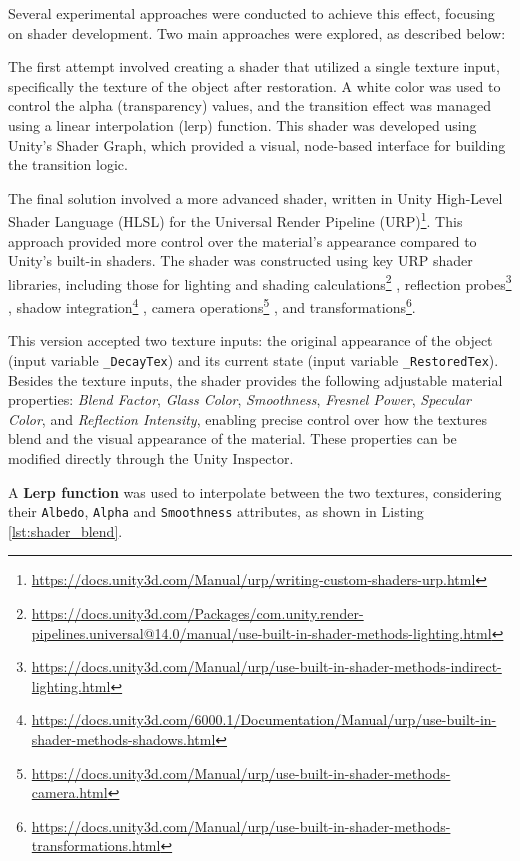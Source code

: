 Several experimental approaches were conducted to achieve this effect, focusing on shader development.
Two main approaches were explored, as described below:

The first attempt involved creating a shader that utilized a single texture input, specifically the texture of the object after restoration. A white color was used to control the alpha (transparency) values, and the transition effect was managed using a linear interpolation (lerp) function. This shader was developed using Unity’s Shader Graph, which provided a visual, node-based interface for building the transition logic.


The final solution involved a more advanced shader, written in Unity High-Level Shader Language (HLSL) for the Universal Render Pipeline (URP)\footnote{\url{https://docs.unity3d.com/Manual/urp/writing-custom-shaders-urp.html}}. 
This approach provided more control over the material's appearance compared to Unity's built-in shaders.
The shader was constructed using key URP shader libraries, including those for lighting and shading calculations\footnote{\url{https://docs.unity3d.com/Packages/com.unity.render-pipelines.universal@14.0/manual/use-built-in-shader-methods-lighting.html}}
, reflection probes\footnote{\url{https://docs.unity3d.com/Manual/urp/use-built-in-shader-methods-indirect-lighting.html}}
, shadow integration\footnote{\url{https://docs.unity3d.com/6000.1/Documentation/Manual/urp/use-built-in-shader-methods-shadows.html}}
, camera operations\footnote{\url{https://docs.unity3d.com/Manual/urp/use-built-in-shader-methods-camera.html}}
, and transformations\footnote{\url{https://docs.unity3d.com/Manual/urp/use-built-in-shader-methods-transformations.html}}.

This version accepted two texture inputs: the original appearance of the object (input variable \texttt{\_DecayTex}) and its current state (input variable \texttt{\_RestoredTex}).
Besides the texture inputs, the shader provides the following adjustable material properties: \emph{Blend Factor}, \emph{Glass Color}, \emph{Smoothness}, \emph{Fresnel Power}, \emph{Specular Color}, and \emph{Reflection Intensity}, enabling precise control over how the textures blend and the visual appearance of the material. 
These properties can be modified directly through the Unity Inspector.

A \textbf{Lerp function} was used to interpolate between the two textures, considering their \texttt{Albedo}, \texttt{Alpha} and \texttt{Smoothness} attributes, as shown in Listing \ref{lst:shader_blend}. %


